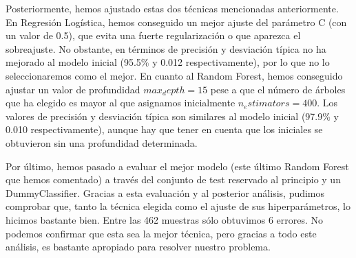 \documentclass[11pt,a4paper]{article}
\begin{document}
Posteriormente, hemos ajustado estas dos técnicas mencionadas anteriormente. En Regresión Logística, hemos conseguido un mejor ajuste del
parámetro C (con un valor de 0.5), que evita una fuerte regularización o que aparezca el sobreajuste. No obstante, en términos de
precisión y desviación típica no ha mejorado al modelo inicial (95.5\% y 0.012 respectivamente), por lo que no lo seleccionaremos como el
mejor. En cuanto al Random Forest, hemos conseguido ajustar un valor de profundidad $max_depth = 15$ pese a que el número de árboles que
ha elegido es mayor al que asignamos inicialmente $n_estimators = 400$. Los valores de precisión y desviación típica son similares al
modelo inicial (97.9\% y 0.010 respectivamente), aunque hay que tener en cuenta que los iniciales se obtuvieron sin una profundidad
determinada.

Por último, hemos pasado a evaluar el mejor modelo (este último Random Forest que hemos comentado) a través del conjunto de test reservado
al principio y un DummyClassifier. Gracias a esta evaluación y al posterior análisis, pudimos comprobar que, tanto la técnica elegida como
el ajuste de sus hiperparámetros, lo hicimos bastante bien. Entre las 462 muestras sólo obtuvimos 6 errores. No podemos confirmar que esta
sea la mejor técnica, pero gracias a todo este análisis, es bastante apropiado para resolver nuestro problema.

\newpage
\end{document}
